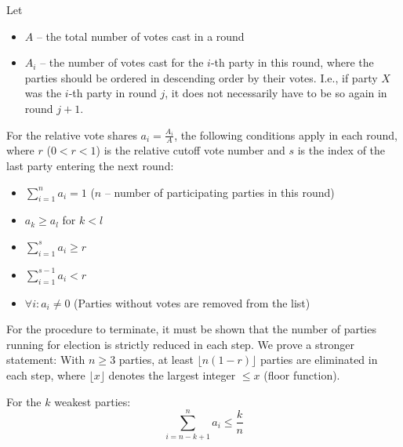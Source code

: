 Let

\begin{itemize}[label={}]
  \item $A$ -- the total number of votes cast in a round
  \item $A_i$ -- the number of votes cast for the $i$-th party in this round,
    where the parties should be ordered in descending order by their votes. I.e., if
    party $X$ was the $i$-th party in round $j$, it does not
    necessarily have to be so again in round $j+1$.
\end{itemize}

For the relative vote shares $a_i = \frac{A_i}{A}$, the following
conditions apply in each round, where $r$ ($0 < r < 1$) is the relative cutoff vote number and $s$ is the index of the
last party entering the next round:

\begin{itemize}[label={}]
  \item[(I)]   $\displaystyle\sum_{i=1}^{n} a_i = 1$
    \quad ($n$ -- number of participating parties in this round)
  \item[(II)]  $a_k \geq a_l$ \quad for $k < l$
  \item[(III)] $\displaystyle\sum_{i=1}^{s} a_i \geq r$
  \item[(IV)]  $\displaystyle\sum_{i=1}^{s-1} a_i < r$
  \item[\phantom{(IV)}] $\forall i: a_i \neq 0$ \quad
    (Parties without votes are removed from the list)
\end{itemize}

For the procedure to terminate, it must be shown that the number of parties running for election
is strictly reduced in each step. We prove a stronger statement: With $n \geq 3$
parties, at least $\lfloor n(1-r) \rfloor$ parties are eliminated in each step, where
$\lfloor x \rfloor$ denotes the largest integer $\leq x$ (floor function).

\begin{lemma}
For the $k$ weakest parties:
\begin{equation}
  \sum_{i=n-k+1}^{n} a_i \leq \frac{k}{n}
\end{equation}
\end{lemma}

